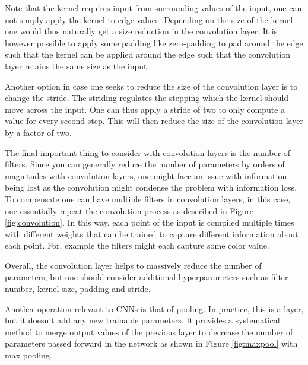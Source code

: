\documentclass[12pt,a4paper]{article} %
\numberwithin{equation}{section}
\begin{document}
		Note that the kernel requires input from surrounding values of the input, one can not simply apply the kernel to edge values. Depending on the size of the kernel one would thus naturally get a size reduction in the convolution layer. It is however possible to apply some padding like zero-padding to pad around the edge such that the kernel can be applied around the edge such that the convolution layer retains the same size as the input.
		
		Another option in case one seeks to reduce the size of the convolution layer is to change the stride. The striding regulates the stepping which the kernel should move across the input. One can thus apply a stride of two to only compute a value for every second step. This will then reduce the size of the convolution layer by a factor of two.
		
		The final important thing to consider with convolution layers is the number of filters. Since you can generally reduce the number of parameters by orders of magnitudes with convolution layers, one might face an issue with information being lost as the convolution might condense the problem with information loss. To compensate one can have multiple filters in convolution layers, in this case, one essentially repeat the convolution process as described in Figure \ref{fig:convolution}. In this way, each point of the input is compiled multiple times with different weights that can be trained to capture different information about each point. For, example the filters might each capture some color value.
		
		Overall, the convolution layer helps to massively reduce the number of parameters, but one should consider additional hyperparameters such as filter number, kernel size, padding and stride.
		
		Another operation relevant to CNNs is that of pooling. In practice, this is a layer, but it doesn't add any new trainable parameters. It provides a systematical method to merge output values of the previous layer to decrease the number of parameters passed forward in the network as shown in Figure \ref{fig:maxpool} with max pooling.
		
\end{document}
